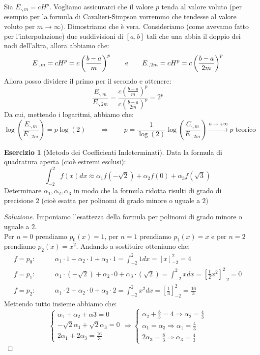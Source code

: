 \documentclass[11pt,a4paper,twoside]{article}
\theoremstyle{definition}
\newtheorem*{ese}{Esercizio}
\newenvironment{sol}
	{\renewcommand\qedsymbol{$\blacksquare$}\begin{proof}[Soluzione]}
	{\end{proof}}
\begin{document}
Sia $E_{\cdot, m} = cH^p$. Vogliamo assicurarci che il valore $p$ tenda al valore voluto (per esempio per la formula di Cavalieri-Simpson vorremmo che tendesse al valore voluto per $m\to \infty$). Dimostriamo che è vera. Consideriamo (come avevamo fatto per l'interpolazione) due suddivisioni di $[a,b]$ tali che una abbia il doppio dei nodi dell'altra, allora abbiamo che:
\[ E_{\cdot,m} = cH^p = c\left( \frac{b-a}m \right)^p \qquad \text e \qquad E_{\cdot, 2m} = cH^p = c\left( \frac {b-a}{2m} \right)^p \]
Allora posso dividere il primo per il secondo e ottenere:
\[ \frac{E_{\cdot, m}}{E_{\cdot, 2m}} = \frac{\displaystyle{c\left(\frac{b-a}m\right)^p}}{\displaystyle{c\left(\frac{b-a}{2m}\right)^p}} = 2^p \]
Da cui, mettendo i logaritmi, abbiamo che:
\[ \log\left( \frac{E_{\cdot, m}}{E_{\cdot, 2m}} \right) = p \log(2)\qquad \Rightarrow \qquad p = \frac{1}{\log(2)}\log\left( \frac{C_{\cdot, m}}{E_{\cdot,2m}} \right)\xrightarrow{n \to +\infty} p\text{ teorico} \]

\begin{ese}[Metodo dei Coefficienti Indeterminati]
	Data la formula di quadratura aperta (cioè estremi esclusi):
	\[ \int_{-2}^2 f(x)dx \approx \alpha_1 f(-\sqrt 2) + \alpha_2f(0) + \alpha_3 f(\sqrt 3) \]
	Determinare $\alpha_1,\alpha_2, \alpha_3$ in modo che la formula ridotta risulti di grado di precisione $2$ (cioè esatta per polinomi di grado minore o uguale a $2$)
\end{ese}

\begin{sol}
	Imponiamo l'esattezza della formula per polinomi di grado minore o uguale a $2$.\\
	Per $n = 0$ prendiamo $p_0(x) = 1$, per $n = 1$ prendiamo $p_1(x) = x$ e per $n=2$ prendiamo $p_2(x) = x^2$. Andando a sostituire otteniamo che:
	\begin{align*}
		f = p_0 :\qquad & \alpha_1 \cdot 1 + \alpha_2 \cdot 1 + \alpha_3 \cdot 1= \int_{-2}^2 1dx = [x]_{-2}^2 = 4\\
		f = p_1: \qquad & \alpha_1 \cdot (-\sqrt 2) + \alpha_2 \cdot 0 + \alpha_3 \cdot (\sqrt 2) = \int_{-2}^2 xdx = \left[\frac 12 x^2\right]_{-2}^2 = 0\\
		f = p_2: \qquad & \alpha_1 \cdot 2 + \alpha_2 \cdot 0 + \alpha_3 \cdot 2 = \int_{-2}^2 x^2dx = \left[\frac 13\right]_{-2}^2 = \frac {16}3
	\end{align*}
	Mettendo tutto insieme abbiamo che:
	\[ \begin{cases}
		\alpha_1 + \alpha_2 + \alpha 3 = 0\\
		-\sqrt 2 \alpha_1 + \sqrt 2 \alpha_3 = 0\\
		2 \alpha_1 + 2 \alpha_3 = \frac {16}3
	\end{cases} \Rightarrow \begin{cases}
		\alpha_2 + \frac 83 = 4 \Rightarrow \alpha_2 = \frac 43\\
		\alpha_1 = \alpha_3 \Rightarrow \alpha_1 = \frac 43\\
		2\alpha_3 = \frac 83 \Rightarrow \alpha_3 = \frac 43
	\end{cases}\]
\end{sol}
\end{document}
